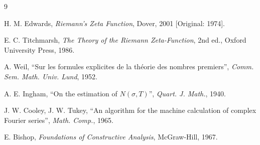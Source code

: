 \documentclass[12pt,a4paper]{amsart}
\theoremstyle{plain}
\theoremstyle{definition}
\theoremstyle{remark}
\begin{document}
\begin{thebibliography}{9}

 H. M. Edwards, \textit{Riemann's Zeta Function}, Dover, 2001 [Original: 1974].

 E. C. Titchmarsh, \textit{The Theory of the Riemann Zeta-Function}, 2nd ed., Oxford University Press, 1986.

 A. Weil, ``Sur les formules explicites de la th\'eorie des nombres premiers'', \textit{Comm. Sem. Math. Univ. Lund}, 1952.

 A. E. Ingham, ``On the estimation of $N(\sigma,T)$'', \textit{Quart. J. Math.}, 1940.

 J. W. Cooley, J. W. Tukey, ``An algorithm for the machine calculation of complex Fourier series'', \textit{Math. Comp.}, 1965.

 E. Bishop, \textit{Foundations of Constructive Analysis}, McGraw-Hill, 1967.

\end{thebibliography}
\end{document}
